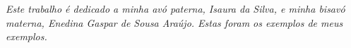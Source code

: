 \begin{dedicatoria}
   \vspace*{\fill}
   \centering
   \noindent

   \textit{Este trabalho é dedicado a minha avó paterna, Isaura da Silva, e minha bisavó materna, Enedina Gaspar de Sousa Araújo. Estas foram os exemplos de meus exemplos.} \vspace*{\fill}
\end{dedicatoria}
